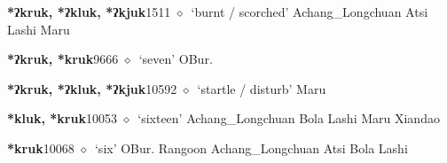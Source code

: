   \begin{list}{}{\leftmargin=1.5em \itemindent=-1.5em}
  \item {\footnotesize \textbf{*ʔkruk, *ʔkluk, *ʔkjuk}}{\tiny 1511}
         $\diamond$~`burnt / scorched'
         Achang\_Longchuan 
\hspace{1ex}
         Atsi 
\hspace{1ex}
         Lashi 
\hspace{1ex}
         Maru 
  \item {\footnotesize \textbf{*ʔkruk, *kruk}}{\tiny 9666}
\hspace{1ex}
         $\diamond$~`seven'
         OBur. 
  \item {\footnotesize \textbf{*ʔkruk, *ʔkluk, *ʔkjuk}}{\tiny 10592}
\hspace{1ex}
         $\diamond$~`startle / disturb'
         Maru 
  \item {\footnotesize \textbf{*kluk, *kruk}}{\tiny 10053}
\hspace{1ex}
         $\diamond$~`sixteen'
         Achang\_Longchuan 
\hspace{1ex}
         Bola 
\hspace{1ex}
         Lashi 
\hspace{1ex}
         Maru 
\hspace{1ex}
         Xiandao 
  \item {\footnotesize \textbf{*kruk}}{\tiny 10068}
\hspace{1ex}
         $\diamond$~`six'
         OBur. 
\hspace{1ex}
         Rangoon 
\hspace{1ex}
         Achang\_Longchuan 
\hspace{1ex}
         Atsi 
\hspace{1ex}
         Bola 
\hspace{1ex}
         Lashi 

\end{list}
